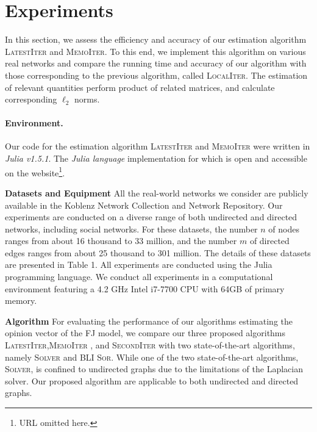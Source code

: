 \documentclass[sigconf,review, nonacm]{acmart}
\begin{document}
\section{Experiments}
In this section, we assess the efficiency and accuracy of our estimation algorithm \textsc{LatestIter} and \textsc{MemoIter}. To this end, we implement this algorithm on various real networks and compare the running time and accuracy of our algorithm with those corresponding to the previous algorithm, called \textsc{LocalIter}. The estimation of relevant quantities perform product of related matrices, and calculate corresponding $\ell_2$ norms.

\paragraph{Environment.}
Our code for the estimation algorithm \textsc{LatestIter} and \textsc{MemoIter} were written in \textit{Julia v1.5.1}. The \textit{Julia language} implementation for which is open and accessible on the website\footnote{URL omitted here.}.

\textbf{Datasets and Equipment}
All the real-world networks we consider are publicly available in the Koblenz Network Collection and Network Repository. 
Our experiments are conducted on a diverse range of both undirected and directed networks, including social networks. For these datasets, the number $n$ of nodes ranges from about 16 thousand to 33 million, and the number $m$ of directed edges ranges from about 25 thousand to 301 million. The details of these datasets are presented in Table 1. All experiments are conducted using the Julia programming language.
We conduct all experiments in a computational environment featuring a 4.2 GHz Intel i7-7700 CPU with 64GB of primary memory.


\textbf{Algorithm}
For evaluating the performance of our algorithms
estimating the opinion vector of the FJ model, we compare our three proposed algorithms \textsc{LatestIter},\textsc{MemoIter} , and \textsc{SecondIter} with two state-of-the-art algorithms, namely \textsc{Solver} and \textsc{BLI  Sor}. While one of the two state-of-the-art algorithms, \textsc{Solver}, is confined to undirected graphs due to the limitations of the Laplacian solver. Our proposed algorithm are applicable to both undirected and directed graphs.
\end{document}
